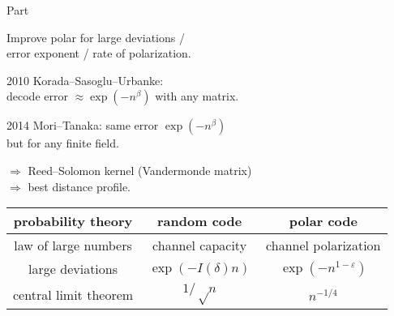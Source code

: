 \documentclass[12pt, aspectratio=1610]{beamer}
\begin{document}
\begin{frame}
	\centering
	Part \insertromanpartnumber
	
	\color{structure.fg}
	\insertpart
\end{frame}

\begin{frame}
	Improve polar for large deviations / \\
	error exponent / rate of polarization.

	\pause

	2010 Korada--Sasoglu--Urbanke: \\
	decode error $≈ \exp(-n^β)$ with any matrix.

	\pause

	2014 Mori--Tanaka: same error $\exp(-n^β)$ \\
	but for any finite field.

	\pause

	$⇒$ Reed--Solomon kernel (Vandermonde matrix) \\
	$⇒$ best distance profile.
\end{frame}


\begin{frame}
	\centering
	\def\arraystretch{1.5}
	\def\A{\color{alerted text.fg}}
	\begin{tabular}{ccc}
		\toprule
		probability theory    & random code        & polar code           \\
		\midrule
		law of large numbers  & ~channel capacity~ & channel polarization \\
		large deviations      & $\exp(-I(δ)n)$     & \A $\exp(-n^{1-ε})$  \\
		central limit theorem & $1/√n$             & $n^{-1/4}$           \\
		\bottomrule
	\end{tabular}
\end{frame}
\end{document}
